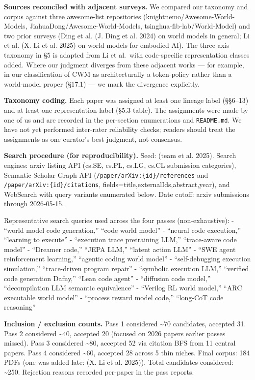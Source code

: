 \documentclass{article}
\begin{document}
\textbf{Sources reconciled with adjacent surveys.} We compared our
taxonomy and corpus against three awesome-list repositories
(knightnemo/Awesome-World-Models, JiahuaDong/Awesome-World-Models,
tsinghua-fib-lab/World-Model) and two prior surveys (Ding et al. (J.
Ding et al. 2024) on world models in general; Li et al. (X. Li et al.
2025) on world models for embodied AI). The three-axis taxonomy in §5 is
adapted from Li et al.~with code-specific representation classes added.
Where our judgment diverges from these adjacent works --- for example,
in our classification of CWM as architecturally a token-policy rather
than a world-model proper (§17.1) --- we mark the divergence explicitly.

\textbf{Taxonomy coding.} Each paper was assigned at least one lineage
label (§§6--13) and at least one representation label (§5.3 table). The
assignments were made by one of us and are recorded in the per-section
enumerations and \texttt{README.md}. We have not yet performed
inter-rater reliability checks; readers should treat the assignments as
one curator's best judgment, not consensus.

\textbf{Search procedure (for reproducibility).} Seed: (team et al.
2025). Search engines: arxiv listing API (cs.SE, cs.PL, cs.LG, cs.CL
submission categories), Semantic Scholar Graph API
(\texttt{/paper/arXiv:\{id\}/references} and
\texttt{/paper/arXiv:\{id\}/citations},
fields=title,externalIds,abstract,year), and WebSearch with query
variants enumerated below. Date cutoff: arxiv submissions through
2026-05-15.

Representative search queries used across the four passes
(non-exhaustive): - ``world model code generation,'' ``code world
model'' - ``neural code execution,'' ``learning to execute'' -
``execution trace pretraining LLM,'' ``trace-aware code model'' -
``Dreamer code,'' ``JEPA LLM,'' ``latent action LLM'' - ``SWE agent
reinforcement learning,'' ``agentic coding world model'' -
``self-debugging execution simulation,'' ``trace-driven program repair''
- ``symbolic execution LLM,'' ``verified code generation Dafny,'' ``Lean
code agent'' - ``diffusion code model,'' ``decompilation LLM semantic
equivalence'' - ``Verilog RL world model,'' ``ARC executable world
model'' - ``process reward model code,'' ``long-CoT code reasoning''

\textbf{Inclusion / exclusion counts.} Pass 1 considered
\textasciitilde70 candidates, accepted 31. Pass 2 considered
\textasciitilde40, accepted 20 (focused on 2026 papers earlier passes
missed). Pass 3 considered \textasciitilde80, accepted 52 via citation
BFS from 11 central papers. Pass 4 considered \textasciitilde60,
accepted 28 across 5 thin niches. Final corpus: 184 PDFs (one was added
late: (X. Li et al. 2025)). Total candidates considered:
\textasciitilde250. Rejection reasons recorded per-paper in the pass
reports.
\end{document}
